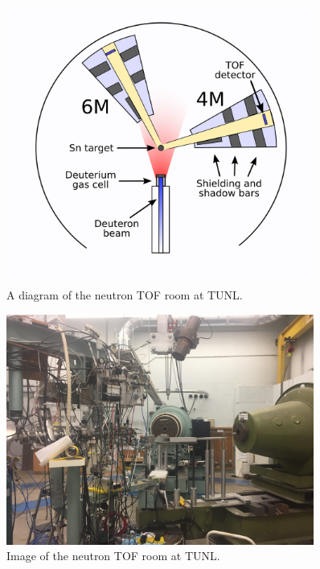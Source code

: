 \begin{figure}
  \begin{center}
\includegraphics[width = 0.9\textwidth]{figures/ExperimentalSetupTUNL.png}
\caption{A diagram of the neutron TOF room at TUNL.} 
\label{ExperimentalSetupTUNL}
\end{center}
\end{figure}

\begin{figure}
  \begin{center}
\includegraphics[width = 0.9\textwidth]{figures/TOFRoomPhoto.jpg}
\caption{Image of the neutron TOF room at TUNL.} 
\label{TOFRoomPhoto}
\end{center}
\end{figure}

